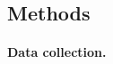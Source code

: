   \begin{small} %
\section*{\normalsize Methods}\label{sec:methods} %
\paragraph{\small Data collection.} %


\end{small}
